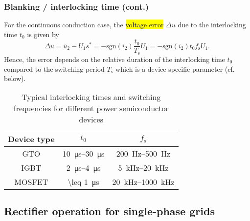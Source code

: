 \begin{frame}
    \frametitle{Blanking / interlocking time (cont.)} 
        For the continuous conduction case, the \hl{voltage error} $\Delta u$ due to the interlocking time $t_0$ is given by
        \begin{equation}
            \Delta u =\overline{u}_2 - U_1s^* = -\mathrm{sgn}(i_2)\frac{t_0}{T_\mathrm{s}}  U_1= -\mathrm{sgn}(i_2)t_0 f_\mathrm{s} U_1.
        \end{equation}
        Hence, the error depends on the relative duration of the interlocking time $t_0$ compared to the switching period $T_\mathrm{s}$ which is a device-specific parameter (cf. below). 

        \begin{table}
            \begin{tabular}{c c c}
                \toprule
                Device type & $t_0$ & $f_\mathrm{s}$ \\
                \midrule
                GTO & \SIrange{10}{30}{\micro\second} & \SIrange{200}{500}{\hertz} \\
                IGBT & \SIrange{2}{4}{\micro\second} & \SIrange{5}{20}{\kilo\hertz} \\
                MOSFET & \SI{\leq 1}{\micro\second} & \SIrange{20}{1000}{\kilo\hertz} \\
                \bottomrule
            \end{tabular}
            \caption{Typical interlocking times and switching frequencies for different power semiconductor devices}
            \label{tab:interlocking_times}
        \end{table}
\end{frame}

\subsection{Rectifier operation for single-phase grids} 


